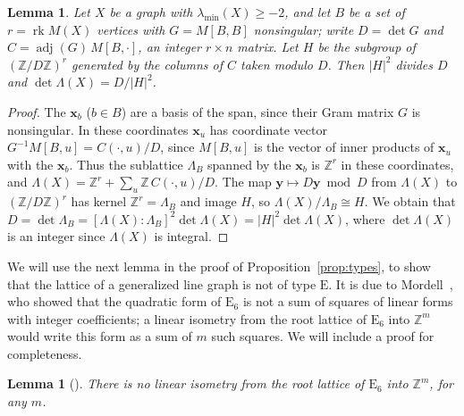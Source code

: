 \documentclass[11pt]{article}
\newcommand\ints{{\mathbb Z}}
\newcommand\Zy{{\mathbf y}}
\newcommand\Zx{{\mathbf x}}
\newcommand\opk[1]{\mathop{\mathrm{#1}}\nolimits}
\newcommand\inv{^{-1}}
\newcommand\rk{\opk{rk}}
\newtheorem{lemma}[theorem]{Lemma}
\theoremstyle{definition}
\newcommand{\typ}[1]{\mathrm{#1}}
\newcommand{\lmin}{\lambda_{\min}}
\begin{document}
\begin{lemma}\label{lem:basisdet}
Let $X$ be a graph with $\lmin(X)\ge-2$, and let $B$ be a set of $r=\rk M(X)$ vertices with
$G=M[B,B]$ nonsingular; write $D=\det G$ and $C=\operatorname{adj}(G)\,M[B,\cdot]$, an integer
$r\times n$ matrix. Let $H$ be the subgroup of $(\ints/D\ints)^r$ generated by the columns of
$C$ taken modulo $D$. Then $\lvert H\rvert^2$ divides $D$ and $\det\Lambda(X)=D/\lvert
H\rvert^2$.
\end{lemma}

\begin{proof}
The $\Zx_b$ ($b\in B$) are a basis of the span, since their Gram matrix $G$ is nonsingular. In
these coordinates $\Zx_u$ has coordinate vector $G\inv M[B,u]=C(\cdot,u)/D$, since $M[B,u]$ is
the vector of inner products of $\Zx_u$ with the $\Zx_b$. Thus the sublattice $\Lambda_B$
spanned by the $\Zx_b$ is $\ints^r$ in these coordinates, and $\Lambda(X)=\ints^r+\sum_u\ints\,
C(\cdot,u)/D$. The map $\Zy\mapsto D\Zy\bmod D$ from $\Lambda(X)$ to $(\ints/D\ints)^r$ has kernel
$\ints^r=\Lambda_B$ and image $H$, so $\Lambda(X)/\Lambda_B\cong H$. We obtain that
$D=\det\Lambda_B=[\Lambda(X):\Lambda_B]^2\det\Lambda(X)=\lvert H\rvert^2\det\Lambda(X)$, where
$\det\Lambda(X)$ is an integer since $\Lambda(X)$ is integral.
\end{proof}

We will use the next lemma in the proof of Proposition~\ref{prop:types}, to show that the
lattice of a generalized line graph is not of type $\typ E$. It is due to Mordell~\cite{Mor37},
who showed that the quadratic form of $\typ E_6$ is not a sum of squares of linear forms with
integer coefficients; a linear isometry from the root lattice of $\typ E_6$ into $\ints^m$ would
write this form as a sum of $m$ such squares. We will include a proof for completeness.

\begin{lemma}[{\cite{Mor37}}]\label{lem:E6Zm}
There is no linear isometry from the root lattice of $\typ E_6$ into $\ints^m$, for any $m$.
\end{lemma}
\end{document}
